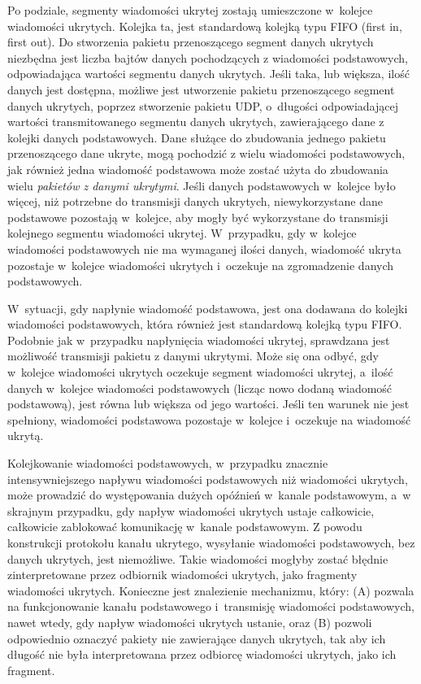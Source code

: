 \documentclass[a4paper, twoside, 12pt]{report}
\begin{document}
    Po podziale, segmenty wiadomości ukrytej zostają umieszczone w~kolejce wiadomości
    ukrytych. Kolejka ta, jest standardową kolejką typu FIFO (first in, first out).
    Do stworzenia pakietu przenoszącego segment danych ukrytych niezbędna jest
    liczba bajtów danych pochodzących z wiadomości podstawowych, odpowiadająca
    wartości segmentu danych ukrytych. Jeśli taka, lub większa, ilość danych jest dostępna,
    możliwe jest utworzenie pakietu przenoszącego segment danych ukrytych, poprzez
    stworzenie pakietu UDP, o~długości odpowiadającej wartości transmitowanego segmentu danych
    ukrytych, zawierającego dane z kolejki danych podstawowych. Dane służące do zbudowania
    jednego pakietu przenoszącego dane ukryte, mogą pochodzić z wielu wiadomości
    podstawowych, jak również jedna wiadomość podstawowa może zostać użyta do zbudowania
    wielu \emph{pakietów z danymi ukrytymi}. Jeśli danych podstawowych
    w~kolejce było więcej, niż potrzebne do transmisji danych ukrytych, niewykorzystane
    dane podstawowe pozostają w~kolejce, aby mogły być wykorzystane do transmisji
    kolejnego segmentu wiadomości ukrytej.
    W~przypadku, gdy w~kolejce wiadomości podstawowych nie ma wymaganej ilości
    danych, wiadomość ukryta pozostaje w~kolejce wiadomości ukrytych i~oczekuje
    na zgromadzenie danych podstawowych.

    W~sytuacji, gdy napłynie wiadomość podstawowa, jest ona dodawana do kolejki
    wiadomości podstawowych, która również jest standardową kolejką typu FIFO.
    Podobnie jak w~przypadku napłynięcia wiadomości ukrytej, sprawdzana jest możliwość
    transmisji pakietu z danymi ukrytymi. Może się ona odbyć, gdy w~kolejce wiadomości
    ukrytych oczekuje segment wiadomości ukrytej, a~ilość danych w~kolejce wiadomości
    podstawowych (licząc nowo dodaną wiadomość podstawową), jest równa lub większa
    od jego wartości. Jeśli ten warunek nie jest spełniony, wiadomości podstawowa
    pozostaje w~kolejce i~oczekuje na wiadomość ukrytą.

    Kolejkowanie wiadomości podstawowych, w~przypadku znacznie intensywniejszego
    napływu wiadomości podstawowych niż wiadomości ukrytych, może prowadzić do
    występowania dużych opóźnień w~kanale podstawowym, a~w skrajnym przypadku,
    gdy napływ wiadomości ukrytych ustaje całkowicie, całkowicie zablokować
    komunikację w~kanale podstawowym. Z powodu konstrukcji protokołu kanału
    ukrytego, wysyłanie wiadomości podstawowych, bez danych ukrytych, jest niemożliwe.
    Takie wiadomości mogłyby zostać błędnie zinterpretowane przez odbiornik wiadomości
    ukrytych, jako fragmenty wiadomości ukrytych. Konieczne jest znalezienie mechanizmu,
    który: (A) pozwala na funkcjonowanie kanału podstawowego i~transmisję wiadomości
    podstawowych, nawet wtedy, gdy napływ wiadomości ukrytych ustanie, oraz (B)
    pozwoli odpowiednio oznaczyć pakiety nie zawierające danych ukrytych, tak aby ich długość
    nie była interpretowana przez odbiorcę wiadomości ukrytych, jako ich fragment.
\end{document}
